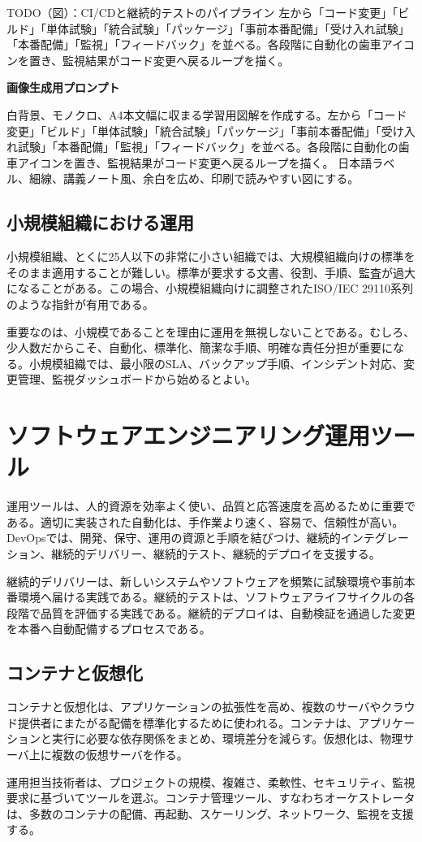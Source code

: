 \documentclass[uplatex,dvipdfmx,a4paper,10pt]{jsarticle}
\newcommand{\todoprompt}[2]{%
\begin{notebox}{TODO（図）：#1}
#2

\textbf{画像生成用プロンプト}

白背景、モノクロ、A4本文幅に収まる学習用図解を作成する。#2 日本語ラベル、細線、講義ノート風、余白を広め、印刷で読みやすい図にする。
\end{notebox}
}
\begin{document}
\todoprompt{CI/CDと継続的テストのパイプライン}{左から「コード変更」「ビルド」「単体試験」「統合試験」「パッケージ」「事前本番配備」「受け入れ試験」「本番配備」「監視」「フィードバック」を並べる。各段階に自動化の歯車アイコンを置き、監視結果がコード変更へ戻るループを描く。}

\subsection{小規模組織における運用}

小規模組織、とくに25人以下の非常に小さい組織では、大規模組織向けの標準をそのまま適用することが難しい。標準が要求する文書、役割、手順、監査が過大になることがある。この場合、小規模組織向けに調整されたISO/IEC 29110系列のような指針が有用である。

重要なのは、小規模であることを理由に運用を無視しないことである。むしろ、少人数だからこそ、自動化、標準化、簡潔な手順、明確な責任分担が重要になる。小規模組織では、最小限のSLA、バックアップ手順、インシデント対応、変更管理、監視ダッシュボードから始めるとよい。

\section{ソフトウェアエンジニアリング運用ツール}

運用ツールは、人的資源を効率よく使い、品質と応答速度を高めるために重要である。適切に実装された自動化は、手作業より速く、容易で、信頼性が高い。DevOpsでは、開発、保守、運用の資源と手順を結びつけ、継続的インテグレーション、継続的デリバリー、継続的テスト、継続的デプロイを支援する。

継続的デリバリーは、新しいシステムやソフトウェアを頻繁に試験環境や事前本番環境へ届ける実践である。継続的テストは、ソフトウェアライフサイクルの各段階で品質を評価する実践である。継続的デプロイは、自動検証を通過した変更を本番へ自動配備するプロセスである。

\subsection{コンテナと仮想化}

コンテナと仮想化は、アプリケーションの拡張性を高め、複数のサーバやクラウド提供者にまたがる配備を標準化するために使われる。コンテナは、アプリケーションと実行に必要な依存関係をまとめ、環境差分を減らす。仮想化は、物理サーバ上に複数の仮想サーバを作る。

運用担当技術者は、プロジェクトの規模、複雑さ、柔軟性、セキュリティ、監視要求に基づいてツールを選ぶ。コンテナ管理ツール、すなわちオーケストレータは、多数のコンテナの配備、再起動、スケーリング、ネットワーク、監視を支援する。
\end{document}
